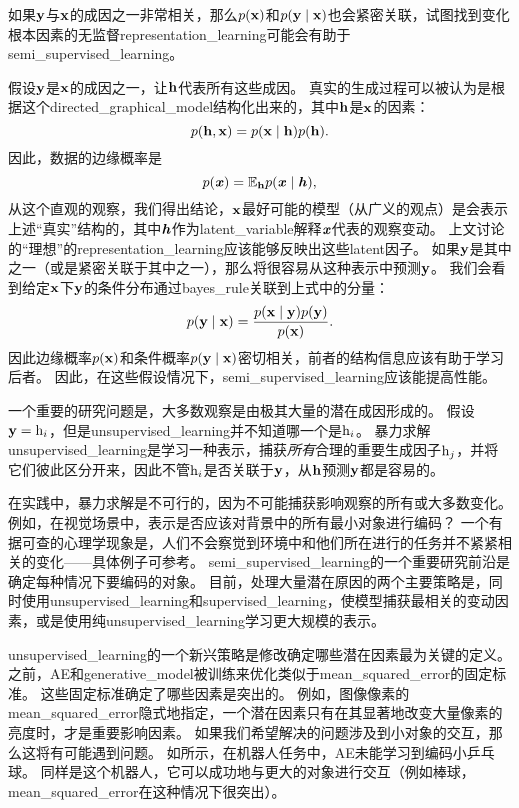 如果$\mathbf{y}$与$\mathbf{x}$的成因之一非常相关，那么$p(\mathbf{x})$和$p(\mathbf{y} \mid \mathbf{x})$也会紧密关联，试图找到变化根本因素的无监督\gls{representation_learning}可能会有助于\gls{semi_supervised_learning}。


假设$\mathbf{y}$是$\mathbf{x}$的成因之一，让$\mathbf{h}$代表所有这些成因。
真实的生成过程可以被认为是根据这个\gls{directed_graphical_model}结构化出来的，其中$\mathbf{h}$是$\mathbf{x}$的因素：
\begin{equation}
	p(\mathbf{h}, \mathbf{x}) = p(\mathbf{x} \mid \mathbf{h}) p(\mathbf{h}).
\end{equation}
因此，数据的边缘概率是
\begin{equation}
	p(\boldsymbol{\mathit{x}}) = \mathbb{E}_{\mathbf{h}} p(\boldsymbol{\mathit{x}} \mid \boldsymbol{\mathit{h}}),
\end{equation}
从这个直观的观察，我们得出结论，$\mathbf{x}$最好可能的模型（从广义的观点）是会表示上述``真实''结构的，其中$\boldsymbol{\mathit{h}}$作为\gls{latent_variable}解释$\boldsymbol{\mathit{x}}$代表的观察变动。
上文讨论的``理想''的\gls{representation_learning}应该能够反映出这些\gls{latent}因子。
如果$\mathbf{y}$是其中之一（或是紧密关联于其中之一），那么将很容易从这种表示中预测$\mathbf{y}$。
我们会看到给定$\mathbf{x}$下$\mathbf{y}$的条件分布通过\gls{bayes_rule}关联到上式中的分量：
\begin{equation}
	p(\mathbf{y} \mid \mathbf{x}) = \frac{ p(\mathbf{x} \mid \mathbf{y}) p(\mathbf{y}) }{p(\mathbf{x})}.
\end{equation}
因此边缘概率$p(\mathbf{x})$和条件概率$p(\mathbf{y} \mid \mathbf{x})$密切相关，前者的结构信息应该有助于学习后者。
因此，在这些假设情况下，\gls{semi_supervised_learning}应该能提高性能。


一个重要的研究问题是，大多数观察是由极其大量的潜在成因形成的。
假设$\mathbf{y} = \mathrm{h}_i$，但是\gls{unsupervised_learning}并不知道哪一个是$\mathrm{h}_i$。
暴力求解\gls{unsupervised_learning}是学习一种表示，捕获\emph{所有}合理的重要生成因子$\mathrm{h}_j$，并将它们彼此区分开来，因此不管$\mathrm{h}_i$是否关联于$\mathbf{y}$，从$\mathbf{h}$预测$\mathbf{y}$都是容易的。


在实践中，暴力求解是不可行的，因为不可能捕获影响观察的所有或大多数变化。
例如，在视觉场景中，表示是否应该对背景中的所有最小对象进行编码？
一个有据可查的心理学现象是，人们不会察觉到环境中和他们所在进行的任务并不紧紧相关的变化——具体例子可参考\cite{simons1998failure}。
\gls{semi_supervised_learning}的一个重要研究前沿是确定每种情况下要编码的对象。
目前，处理大量潜在原因的两个主要策略是，同时使用\gls{unsupervised_learning}和\gls{supervised_learning}，使模型捕获最相关的变动因素，或是使用纯\gls{unsupervised_learning}学习更大规模的表示。


\gls{unsupervised_learning}的一个新兴策略是修改确定哪些潜在因素最为关键的定义。
之前，\gls{AE}和\gls{generative_model}被训练来优化类似于\gls{mean_squared_error}的固定标准。
这些固定标准确定了哪些因素是突出的。
例如，图像像素的\gls{mean_squared_error}隐式地指定，一个潜在因素只有在其显著地改变大量像素的亮度时，才是重要影响因素。
如果我们希望解决的问题涉及到小对象的交互，那么这将有可能遇到问题。
如所示，在机器人任务中，\gls{AE}未能学习到编码小乒乓球。
同样是这个机器人，它可以成功地与更大的对象进行交互（例如棒球，\gls{mean_squared_error}在这种情况下很突出）。


